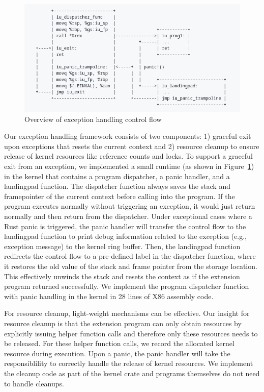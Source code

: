 \begin{figure}
	\includegraphics[width=0.8\linewidth]{figs/EH.png}
	\centering
	\vspace{-10pt}
	\caption{Overview of exception handling control flow}
	\label{fig:eh-overview}
	\vspace{-10pt}
\end{figure}

Our exception handling framework consists of two components: 1) graceful exit
    upon exceptions that resets the current context and 2) resource cleanup to
    ensure release of kernel resources like reference counts and locks.
To support a graceful exit from an exception, we implemented a small runtime
    (as shown in Figure~\ref{fig:eh-overview}) in the kernel that contains a
    program dispatcher, a panic handler, and a landingpad function.
The dispatcher function always saves the stack and framepointer of the current
    context before calling into the program.
If the program executes normally without triggering an exception, it would just
    return normally and then return from the dispatcher.
Under exceptional cases where a Rust panic is triggered, the panic handler will
    transfer the control flow to the landingpad function to print debug
    information related to the exception (e.g., exception message) to the
    kernel ring buffer.
Then, the landingpad function redirects the control flow to a pre-defined label
    in the dispatcher function, where it restores the old value of the stack
    and frame pointer from the storage location.
This effectively unwinds the stack and resets the context as if the extension
    program returned successfully.
We implement the program dispatcher function with panic handling in the kernel
    in 28 lines of X86 assembly code.

For resource cleanup, light-weight mechanisms can be effective.
Our insight for resource cleanup is that the extension program can only obtain
    resources by explicitly issuing helper function calls and therefore only
    these resources needs to be released.
For these helper function calls, we record the allocated kernel resource during
    execution.
Upon a panic, the panic handler will take the responsiblility to correctly
    handle the release of kernel resources.
We implement the cleanup code as part of the \projname{} kernel crate
    and programs themselves do not need to handle cleanups.

